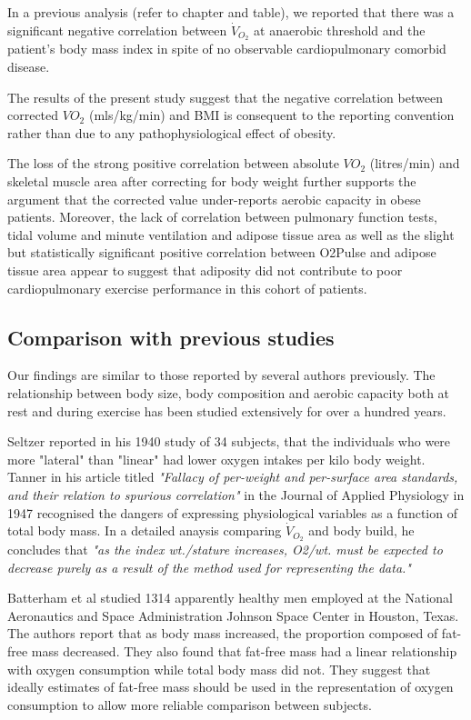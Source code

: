 In a previous analysis (refer to chapter and table), we reported that there was a significant negative correlation between $\dot{V}_{O_2}$ at anaerobic threshold and the patient's body mass index in spite of no observable cardiopulmonary comorbid disease. 

The results of the present study suggest that the negative correlation between corrected $VO_{2}$ (mls/kg/min) and BMI is consequent to the reporting convention rather than due to any pathophysiological effect of obesity. 

The loss of the strong positive correlation between absolute $VO_{2}$ (litres/min) and skeletal muscle area after correcting for body weight further supports the argument that the corrected value under-reports aerobic capacity in obese patients. Moreover, the lack of correlation between pulmonary function tests, tidal volume and minute ventilation and adipose tissue area as well as the slight but statistically significant positive correlation between O2Pulse and adipose tissue area appear to suggest that adiposity did not contribute to poor cardiopulmonary exercise performance in this cohort of patients.

\subsection{Comparison with previous studies}
Our findings are similar to those reported by several authors previously. The relationship between body size, body composition and aerobic capacity both at rest and during exercise has been studied extensively for over a hundred years. 

Seltzer reported in his 1940 study of 34 subjects, that the individuals who were more "lateral" than "linear" had lower oxygen intakes per kilo body weight.\parencite{seltzer_body_1940} Tanner in his article titled \textit{"Fallacy of per-weight and per-surface area standards, and their relation to spurious correlation"}\parencite{tanner_fallacy_1949} in the Journal of Applied Physiology in 1947 recognised the dangers of expressing physiological variables as a function of total body mass. In a detailed anaysis comparing $\dot{V}_{O_2}$ and body build, he concludes that \textit{"as the index wt./stature increases, O2/wt. must be expected to decrease purely as a result of the method used for representing the data." }

Batterham et al studied 1314 apparently healthy men employed at the National Aeronautics and Space Administration Johnson Space Center in Houston, Texas.\parencite{batterham_modeling_1999} The authors report that as body mass increased, the proportion composed of fat-free mass decreased. They also found that fat-free mass had a linear relationship with oxygen consumption while total body mass did not. They suggest that ideally estimates of fat-free mass should be used in the representation of oxygen consumption to allow more reliable comparison between subjects. 

